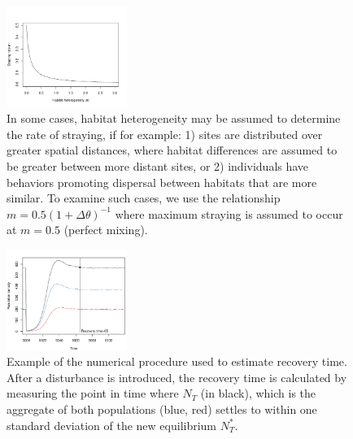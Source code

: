 \documentclass{revtex4}
\begin{document}
\begin{figure}[h]
  \captionsetup{justification=raggedright,
singlelinecheck=false
}
\centering
\includegraphics[width=0.35\textwidth]{fig_mthetarelation.pdf}
\caption{
In some cases, habitat heterogeneity may be assumed to determine the rate of straying, if for example:
1) sites are distributed over greater spatial distances, where habitat differences are assumed to be greater between more distant sites, or 2) individuals have behaviors promoting dispersal between habitats that are more similar. To examine such cases, we use the relationship $m= 0.5(1 + \Delta\theta)^{-1}$ where maximum straying is assumed to occur at $m=0.5$ (perfect mixing).
} \label{fig:mthetarelation}
\end{figure}


\begin{figure}
  \captionsetup{justification=raggedright,
singlelinecheck=false
}
\centering
\includegraphics[width=0.35\textwidth]{fig_recovery.pdf}
\caption{
Example of the numerical procedure used to estimate recovery time. After a disturbance is introduced, the recovery time is calculated by measuring the point in time where $N_T$ (in black), which is the aggregate of both populations (blue, red) settles to within one standard deviation of the new equilibrium $N_T^*$. 
} \label{fig:recovery}
\end{figure}
\end{document}

